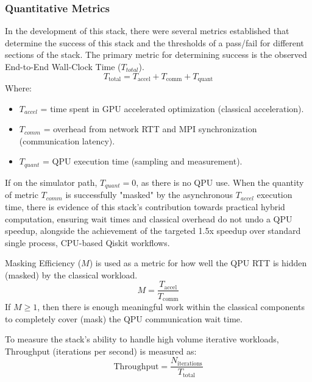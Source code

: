 \subsubsection{Quantitative Metrics}
In the development of this stack, there were several metrics established that determine the success of this stack and the thresholds of 
a pass/fail for different sections of the stack. The primary metric for determining success is the observed End-to-End Wall-Clock Time ($T_{total}$). 
   \begin{equation}
    T_{\text{total}} = T_{\text{accel}} + T_{\text{comm}} + T_{\text{quant}}
\end{equation}
Where: 
\begin{itemize}
    \item $T_{accel}$ = time spent in GPU accelerated optimization (classical acceleration).
    \item $T_{comm}$ = overhead from network RTT and MPI synchronization (communication latency).
    \item $T_{quant}$ = QPU execution time (sampling and measurement).
\end{itemize}

\noindent If on the simulator path, $T_{quant} = 0$, as there is no QPU use. When the quantity of metric $T_{comm}$ is successfully "masked" by the asynchronous $T_{accel}$ 
execution time, there is evidence of this stack's contribution towards practical hybrid computation, ensuring wait times and classical overhead do not undo a QPU speedup, alongside the achievement of the targeted 1.5x speedup over standard single process, CPU-based Qiskit workflows.   

\noindent Masking Efficiency ($M$) is used as a metric for how well the QPU RTT is hidden (masked) by the classical workload. 
\begin{equation}
    M= \frac{T_{\text{accel}}}{T_{\text{comm}}}
\end{equation}
If $M \ge 1$, then there is enough meaningful work within the classical components to completely cover (mask) the QPU communication wait time. 

\noindent To measure the stack's ability to handle high volume iterative workloads, Throughput (iterations per second) is measured as:
\begin{equation}
        \text{Throughput} = \frac{N_{\text{iterations}}}{T_{\text{total}}}
\end{equation}

